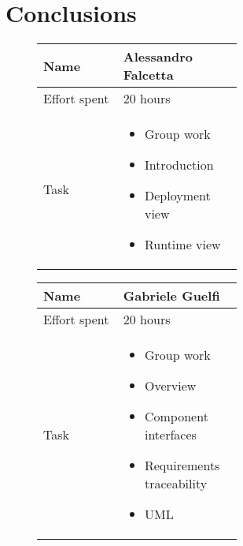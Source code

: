 \chapter{Conclusions}
\label{chap:conclusions}
\begin{figure}[H]
    \begin{tabular}{|l|p{0.6\linewidth}|}
	\hline Name & Alessandro Falcetta \\
	\hline Effort spent & 20 hours \\
	\hline Task & \begin{itemize} 
			\item Group work
			\item Introduction
			\item Deployment view
			\item Runtime view
		    \end{itemize}\\
    	\hline
    \end{tabular}
\end{figure}
\vspace{0.5cm}
\begin{figure}[H]
    \begin{tabular}{|l|p{0.6\linewidth}|}
	\hline Name & Gabriele Guelfi \\
	\hline Effort spent & 20 hours \\
	\hline Task & \begin{itemize} 
			\item Group work
			\item Overview
			\item Component interfaces
			\item Requirements traceability
			\item UML
                     \end{itemize}\\
	\hline
	\end{tabular}
\end{figure}
